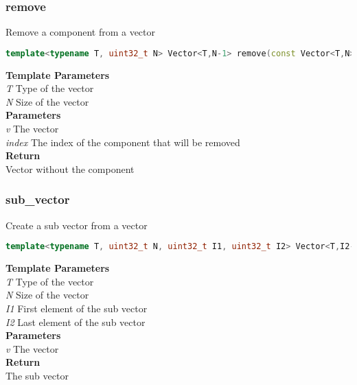 \subsubsection{remove}
\begin{mdframed}
Remove a component from a vector
\begin{lstlisting}[language=C++]
template<typename T, uint32_t N> Vector<T,N-1> remove(const Vector<T,N>&v, uint32_t index) 
\end{lstlisting}
\textbf{Template Parameters} \\ 
\textit{T} Type of the vector \\ 
\textit{N} Size of the vector \\ 
\textbf{Parameters} \\ 
\textit{v} The vector \\ 
\textit{index} The index of the component that will be removed \\ 
\textbf{Return} \\ 
Vector without the component\\ 
\end{mdframed}

\subsubsection{sub\_vector}
\begin{mdframed}
Create a sub vector from a vector
\begin{lstlisting}[language=C++]
template<typename T, uint32_t N, uint32_t I1, uint32_t I2> Vector<T,I2-I1+1> sub_vector(const Vector<T,N>& v) 
\end{lstlisting}
\textbf{Template Parameters} \\ 
\textit{T} Type of the vector \\ 
\textit{N} Size of the vector \\ 
\textit{I1} First element of the sub vector \\ 
\textit{I2} Last element of the sub vector \\ 
\textbf{Parameters} \\ 
\textit{v} The vector \\ 
\textbf{Return} \\ 
The sub vector\\ 
\end{mdframed}

